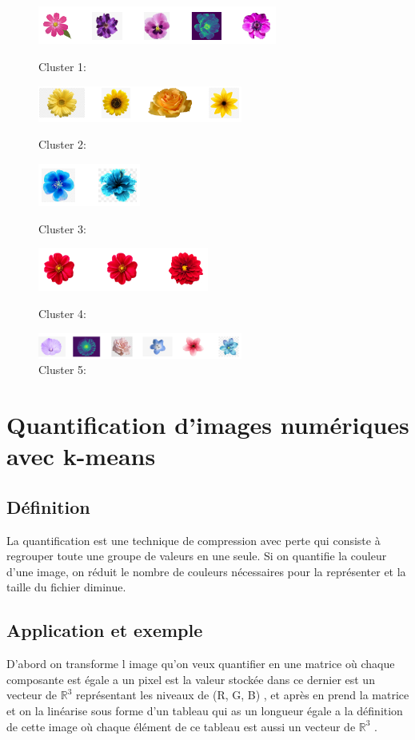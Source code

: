 \documentclass[a4paper,12pt]{report}
\begin{document}
\begin{figure}[!h]
    \includegraphics[width=0.7\textwidth]{1.PNG}
        \caption{Cluster 1:}
    \includegraphics[width=0.6\textwidth]{2.PNG}
        \caption{Cluster 2:}
    \includegraphics[width=0.3\textwidth]{3.PNG}
        \caption{Cluster 3:}
    \includegraphics[width=0.5\textwidth]{4.PNG}
        \caption{Cluster 4:}
    \includegraphics[width=0.6\textwidth]{5.PNG}
        \caption{Cluster 5:}
\end{figure}


\section{Quantification  d'images numériques avec k-means}
\subsection*{Définition }
La quantification est une technique de compression avec perte qui consiste à regrouper toute une groupe de valeurs en une seule. Si on quantifie la couleur d'une image, on réduit le nombre de couleurs nécessaires pour la représenter et la taille du fichier diminue.

\subsection*{Application et exemple }
D'abord on transforme l image qu'on veux quantifier en une matrice o\`u chaque composante est égale a un pixel est la valeur stockée dans ce dernier est un vecteur de $\mathbb{R}^3$ représentant les niveaux de (R, G, B) , et après en prend la matrice et on la linéarise sous forme d'un tableau qui as un longueur égale a la définition de cette image o\`u chaque élément de ce tableau est aussi un vecteur de $\mathbb{R}^3$  .   
 
\end{document}
